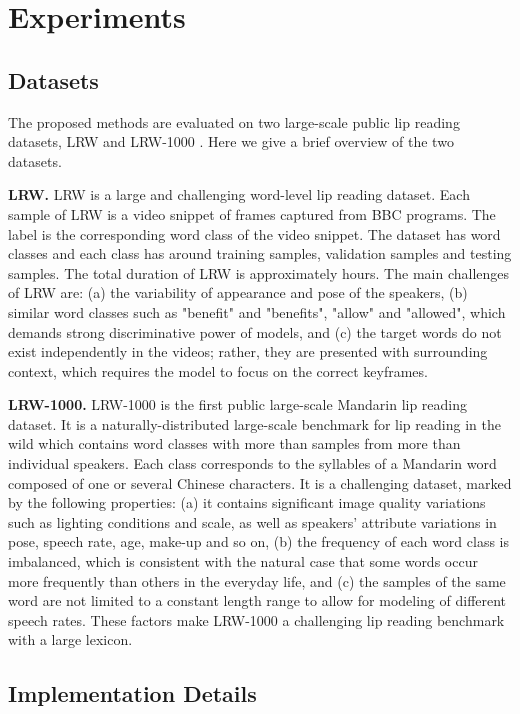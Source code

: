 \documentclass[a4paper, 10pt, conference]{ieeeconf}      \usepackage{FG2020}
\begin{document}
\section{Experiments}
 \label{sec:experiments}
 
 \subsection{Datasets}
 The proposed methods are evaluated on two large-scale public lip reading datasets, LRW \cite{Chung2016LipRI} and LRW-1000 \cite{yang2019lrw}. Here we give a brief overview of the two datasets.
 
 \textbf{LRW.} LRW \cite{Chung2016LipRI} is a large and challenging word-level lip reading dataset. Each sample of LRW is a video snippet of  frames captured from BBC programs. The label is the corresponding word class of the video snippet. The dataset has  word classes and each class has around  training samples,  validation samples and  testing samples. The total duration of LRW is approximately  hours. The main challenges of LRW are: (a) the variability of appearance and pose of the speakers, (b) similar word classes such as "benefit" and "benefits", "allow" and "allowed", which demands strong discriminative power of models, and (c) the target words do not exist independently in the videos; rather, they are presented with surrounding context, which requires the model to focus on the correct keyframes. 
 
 \textbf{LRW-1000.} LRW-1000 \cite{yang2019lrw} is the first public large-scale Mandarin lip reading dataset. It is a naturally-distributed large-scale benchmark for lip reading in the wild which contains  word classes with more than  samples from more than  individual speakers. Each class corresponds to the syllables of a Mandarin word composed of one or several Chinese characters. It is a challenging dataset, marked by the following properties: (a) it contains significant image quality variations such as lighting conditions and scale, as well as speakers' attribute variations in pose, speech rate, age, make-up and so on, (b) the frequency of each word class is imbalanced,  which is consistent with the natural case that some words occur more frequently than others in the everyday life, and (c) the samples of the same word are not limited to a constant length range to allow for modeling of different speech rates. These factors make LRW-1000 a  challenging lip reading benchmark with a large lexicon.
 
 \subsection{Implementation Details}
 
\end{document}
